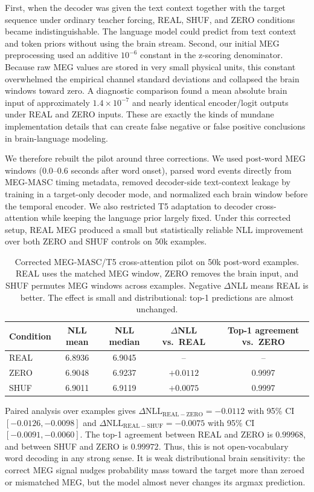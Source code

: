 \documentclass{article}
\begin{document}
First, when the decoder was given the text context together with the target sequence under ordinary teacher forcing, REAL, SHUF, and ZERO conditions became indistinguishable.
The language model could predict from text context and token priors without using the brain stream.
Second, our initial MEG preprocessing used an additive $10^{-6}$ constant in the z-scoring denominator.
Because raw MEG values are stored in very small physical units, this constant overwhelmed the empirical channel standard deviations and collapsed the brain windows toward zero.
A diagnostic comparison found a mean absolute brain input of approximately $1.4 \times 10^{-7}$ and nearly identical encoder/logit outputs under REAL and ZERO inputs.
These are exactly the kinds of mundane implementation details that can create false negative or false positive conclusions in brain-language modeling.

We therefore rebuilt the pilot around three corrections.
We used post-word MEG windows ($0.0$--$0.6$ seconds after word onset), parsed word events directly from MEG-MASC timing metadata, removed decoder-side text-context leakage by training in a target-only decoder mode, and normalized each brain window before the temporal encoder.
We also restricted T5 adaptation to decoder cross-attention while keeping the language prior largely fixed.
Under this corrected setup, REAL MEG produced a small but statistically reliable NLL improvement over both ZERO and SHUF controls on 50k examples.

\begin{table}[t]
\centering
\caption{Corrected MEG-MASC/T5 cross-attention pilot on 50k post-word examples. REAL uses the matched MEG window, ZERO removes the brain input, and SHUF permutes MEG windows across examples. Negative $\Delta$NLL means REAL is better. The effect is small and distributional: top-1 predictions are almost unchanged.}
\label{tab:meg_t5_pilot}
\begin{tabular}{lcccc}
\toprule
Condition & NLL mean & NLL median & $\Delta$NLL vs.\ REAL & Top-1 agreement vs.\ ZERO \\
\midrule
REAL & 6.8936 & 6.9045 & -- & -- \\
ZERO & 6.9048 & 6.9237 & $+0.0112$ & 0.9997 \\
SHUF & 6.9011 & 6.9119 & $+0.0075$ & 0.9997 \\
\bottomrule
\end{tabular}
\end{table}

Paired analysis over examples gives $\Delta\mathrm{NLL}_{\mathrm{REAL-ZERO}}=-0.0112$ with 95\% CI $[-0.0126,-0.0098]$ and $\Delta\mathrm{NLL}_{\mathrm{REAL-SHUF}}=-0.0075$ with 95\% CI $[-0.0091,-0.0060]$.
The top-1 agreement between REAL and ZERO is $0.99968$, and between SHUF and ZERO is $0.99972$.
Thus, this is not open-vocabulary word decoding in any strong sense.
It is weak distributional brain sensitivity: the correct MEG signal nudges probability mass toward the target more than zeroed or mismatched MEG, but the model almost never changes its argmax prediction.
\end{document}
